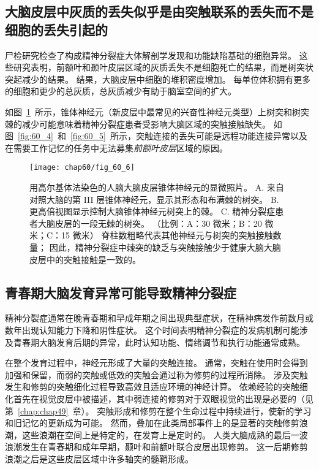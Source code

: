 \subsection{大脑皮层中灰质的丢失似乎是由突触联系的丢失而不是细胞的丢失引起的}

尸检研究检查了构成精神分裂症大体解剖学发现和功能缺陷基础的细胞异常。
这些研究表明，前额叶和颞叶皮层区域的灰质丢失不是细胞死亡的结果，而是树突状突起减少的结果。
结果，大脑皮层中细胞的堆积密度增加。
每单位体积拥有更多的细胞和更少的总灰质，总灰质减少有助于脑室空间的扩大。


如图~\ref{fig:60_6}~所示，锥体神经元（新皮层中最常见的兴奋性神经元类型）上树突和树突棘的减少可能意味着精神分裂症患者受影响大脑区域的突触接触缺失。
如图~\ref{fig:60_4}~和~\ref{fig:60_5}~所示，突触连接的丢失可能是远程功能连接异常以及在需要工作记忆的任务中无法募集\textit{前额叶皮层}区域的原因。


\begin{figure}[htbp]
	\centering
	\texttt{[image: chap60/fig\_60\_6]}
	\caption{用高尔基体法染色的人脑大脑皮层锥体神经元的显微照片。
		A. 来自对照大脑的第 III 层锥体神经元，显示其形态和布满棘的树突。
		B. 更高倍视图显示控制大脑锥体神经元树突上的棘。
		C. 精神分裂症患者大脑皮层的一段无棘的树突。
		（比例：A：30 微米；B：20 微米；C：15 微米）
		脊柱数粗略代表其他神经元与树突的突触接触数量；
		因此，精神分裂症中棘突的缺乏与突触接触少于健康大脑大脑皮层中的突触接触是一致的\cite{garey1998reduced}。}
	\label{fig:60_6}
\end{figure}



\subsection{青春期大脑发育异常可能导致精神分裂症}

精神分裂症通常在晚青春期和早成年期之间出现典型症状，在精神病发作前数月或数年出现认知能力下降和阴性症状。
这个时间表明精神分裂症的发病机制可能涉及青春期大脑发育后期的异常，此时认知功能、情绪调节和执行功能通常成熟。


在整个发育过程中，神经元形成了大量的突触连接。
通常，突触在使用时会得到加强和保留，而弱的突触或低效的突触会通过称为修剪的过程所消除。
涉及突触发生和修剪的突触细化过程导致高效且适应环境的神经计算。
依赖经验的突触细化首先在视觉皮层中被描述，其中弱连接的修剪对于双眼视觉的出现是必要的（见第~\ref{chap:chap49}~章）。
突触形成和修剪在整个生命过程中持续进行，使新的学习和旧记忆的更新成为可能。
然而，叠加在此类局部事件上的是显著的突触修剪浪潮，这些浪潮在空间上是特定的，在发育上是定时的。
人类大脑成熟的最后一波浪潮发生在青春期和成年早期，颞叶和前额叶联合皮层出现修剪。
这一后期修剪浪潮之后是这些皮层区域中许多轴突的髓鞘形成。


